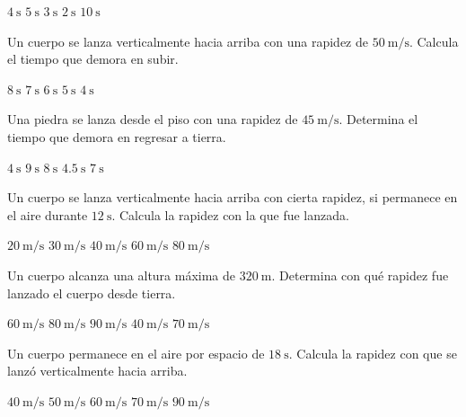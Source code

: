 \documentclass[14pt]{exam}
\begin{document}
\begin{questions}
    \begin{oneparchoices}
        \choice $\SI{4}{\second}$
        \choice $\SI{5}{\second}$
        \choice $\SI{3}{\second}$
        \choice $\SI{2}{\second}$
        \choice $\SI{10}{\second}$
    \end{oneparchoices}
    \question Un cuerpo se lanza verticalmente hacia arriba con una rapidez de $\SI{50}{\meter\per\second}$. Calcula el tiempo que demora en subir.
    \\[0.5em]
    \begin{oneparchoices}
        \choice $\SI{8}{\second}$
        \choice $\SI{7}{\second}$
        \choice $\SI{6}{\second}$
        \choice $\SI{5}{\second}$
        \choice $\SI{4}{\second}$
    \end{oneparchoices}
    \question Una piedra se lanza desde el piso con una rapidez de $\SI{45}{\meter\per\second}$. Determina el tiempo que demora en regresar a tierra.
    \\[0.5em]
    \begin{oneparchoices}
        \choice $\SI{4}{\second}$
        \choice $\SI{9}{\second}$
        \choice $\SI{8}{\second}$
        \choice $\SI{4.5}{\second}$
        \choice $\SI{7}{\second}$
    \end{oneparchoices}
    \question Un cuerpo se lanza verticalmente hacia arriba con cierta rapidez, si permanece en el aire durante $\SI{12}{\second}$. Calcula la rapidez con la que fue lanzada.
    \\[0.5em]
    \begin{oneparchoices}
        \choice $\SI{20}{\meter\per\second}$
        \choice $\SI{30}{\meter\per\second}$
        \choice $\SI{40}{\meter\per\second}$
        \choice $\SI{60}{\meter\per\second}$
        \choice $\SI{80}{\meter\per\second}$
    \end{oneparchoices}
    \question Un cuerpo alcanza una altura máxima de $\SI{320}{\meter}$. Determina con qué rapidez fue lanzado el cuerpo desde tierra.
    \\[0.5em]
    \begin{oneparchoices}
        \choice $\SI{60}{\meter\per\second}$
        \choice $\SI{80}{\meter\per\second}$
        \choice $\SI{90}{\meter\per\second}$
        \choice $\SI{40}{\meter\per\second}$
        \choice $\SI{70}{\meter\per\second}$
        \end{oneparchoices}
    \question Un cuerpo permanece en el aire por espacio de $\SI{18}{\second}$. Calcula la rapidez con que se lanzó verticalmente hacia arriba.
    \\[0.5em]
    \begin{oneparchoices}
        \choice $\SI{40}{\meter\per\second}$
        \choice $\SI{50}{\meter\per\second}$
        \choice $\SI{60}{\meter\per\second}$
        \choice $\SI{70}{\meter\per\second}$
        \choice $\SI{90}{\meter\per\second}$
    \end{oneparchoices}    
\end{questions}
\end{document}
